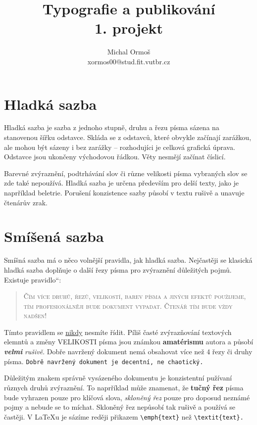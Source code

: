 \documentclass[a4paper, 11pt, twocolumn]{article}
\title{Typografie a publikování\\1. projekt}
\author{Michal Ormoš\\xormos00@stud.fit.vutbr.cz}
\date{}
\providecommand{\uv}[1]{\quotedblbase #1\textquotedblleft}
\begin{document}
\maketitle

\section{Hladká sazba}
Hladká sazba je sazba z jednoho stupně, druhu a řezu písma sázena na stanovenou šířku odstavce. Skláda se z odstavců, které obvykle začínají zarážkou, ale mohou být sázeny i bez zarážky -- rozhodujíci je celková grafická úprava. Odstavce jsou ukončeny východovou řádkou. Věty nesmějí začínat číslicí.

Barevné zvýraznění, podtrhávání slov či různe velikosti písma vybraných slov se zde také nepoužívá. Hladká sazba je určena především pro delší texty, jako je naprříklad beletrie. Porušení konzistence sazby působí v textu rušivě a unavuje čtenárův zrak.

\section{Smíšená sazba}
Smíšná sazba má o něco volnější pravidla, jak hladká sazba. Nejčastěji se klasická hladká sazba doplňuje o další řezy písma pro zvýraznění důležitých pojmů. Existuje \uv{pravidlo}:
\begin{quotation}
\textsc{Čím více druhů, řezů, velikostí, barev písma a jiných efektů použijeme, tím profesionálněji bude dokument vypadat. Čtenář tím bude vždy nadšen!}
\end{quotation}

Tímto pravidlem se \underline{nikdy} nesmíte řídit. Píliš časté zvýrazňování textových elemntů a změny {\Huge V}{\huge E}{\Large L}{\large I}{\normalsize K}{\small O}{\footnotesize S}{\scriptsize T}{\tiny I} {\normalsize písma} {\Large jsou} {\huge známkou} {\huge \textbf {amatérismu}} autora a působí \textbf{\emph{velmi}} \emph{rušivě}. 
Dobře navržený dokument nemá obsahovat více než 4 řezy či druhy písma. \texttt{Dobrě navržený dokument je decentní, ne chaotický.}

Důležitým znakem správně vysázeného dokumentu je konzistentní pužívaní různych druhů zvýraznění. To naprříklad může znamenat, že \textbf{tučný řez} písma bude vyhrazen pouze pro klíčová slova, \emph{skloněný řez} pouze pro doposud neznámé pojmy a nebude se to míchat.
Skloněný řez nepůsobí tak rušivě a používá se častěji. V \LaTeX u je sázíme reději přikazem \verb|\emph{text}| než \verb|\textit{text}.|
\end{document}

